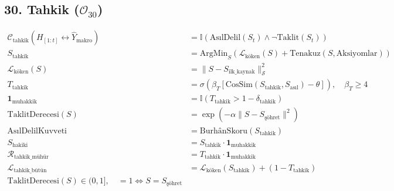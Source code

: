 \documentclass[11pt, a4paper]{article}
\begin{document}
\subsection{30. Tahkik ($\mathcal{O}_{30}$)}
\begin{align}
\mathcal{C}_{\text{tahkik}}(H_{[1:t]} \leftrightarrow \hat{Y}_{\text{makro}}) &= \mathbb{I}\left( \text{AsılDelil}(S_t) \land \neg \text{Taklit}(S_t) \right) \\
S_{\text{tahkik}} &= \text{ArgMin}_{S} \left( \mathcal{L}_{\text{köken}}(S) + \text{Tenakuz}(S, \text{Aksiyomlar}) \right) \\
\mathcal{L}_{\text{köken}}(S) &= \| S - S_{\text{ilk\_kaynak}} \|_{\mathcal{S}}^2 \\
T_{\text{tahkik}} &= \sigma\left( \beta_T \left[ \text{CosSim}(S_{\text{tahkik}}, S_{\text{asıl}}) - \theta \right] \right), \quad \beta_T \ge 4 \\
\mathbf{1}_{\text{muhakkik}} &= \mathbb{I}(T_{\text{tahkik}} > 1 - \delta_{\text{tahkik}}) \\
\text{TaklitDerecesi}(S) &= \exp(-\alpha \|S - S_{\text{şöhret}}\|^2) \\
\text{AsılDelilKuvveti} &= \text{BurhânSkoru}(S_{\text{tahkik}}) \\
S_{\text{hakiki}} &= S_{\text{tahkik}} \cdot \mathbf{1}_{\text{muhakkik}} \\
\mathcal{R}_{\text{tahkik\_mühür}} &= T_{\text{tahkik}} \cdot \mathbf{1}_{\text{muhakkik}} \\
\mathcal{L}_{\text{tahkik\_bütün}} &= \mathcal{L}_{\text{köken}}(S_{\text{tahkik}}) + (1 - T_{\text{tahkik}}) \\
\text{TaklitDerecesi}(S) \in (0, 1], \quad = 1 \iff S = S_{\text{şöhret}}
\end{align}
\end{document}
